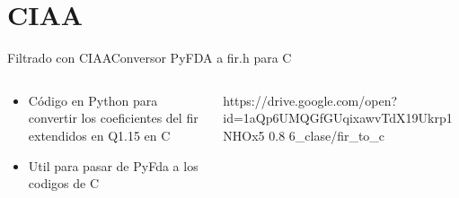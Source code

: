 \section{CIAA}
\begin{frame}[t]{Filtrado con CIAA}{Conversor PyFDA a fir.h para C}
   \handsonicon
   \begin{columns}[t]
      \begin{column}{.4\textwidth}
         \begin{itemize}
            \item{Código en Python para convertir los coeficientes del fir extendidos en Q1.15 en C}
            \item{Util para pasar de PyFda a los codigos de C}
         \end{itemize}
      \end{column}
      \hspace{2pt}
      \vrule
      \hspace{2pt}
      \begin{column}{.6\textwidth}
         {https://drive.google.com/open?id=1aQp6UMQGfGUqixawvTdX19Ukrp1NHOx5}
         {0.8}
         {6_clase/fir_to_c}
      \end{column}
      \hspace{2pt}
   \end{columns}

   \vfill
\end{frame}
